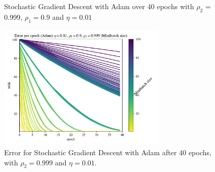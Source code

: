 \documentclass{article}
\theoremstyle{definition}
\begin{document}
\begin{figure}[H]%
    \centering
    \qquad
    \caption{Stochastic Gradient Descent with Adam over 40 epochs with $\rho_2$ = 0.999, $\rho_1=0.9$ and $\eta = 0.01$}%
    \label{fig:SGDadam}%
\end{figure}

\begin{figure}[H]%
    \centering
    \includegraphics[width=8cm]{Project2/figures/polynomial_grad/OLS_autodiff/adam_error_minibatch.pdf}
    \caption{Error for Stochastic Gradient Descent with Adam after 40 epochs, with $\rho_2 = 0.999$ and $\eta=0.01$.}
    \label{fig:SGDadamerror}
\end{figure}
\end{document}
